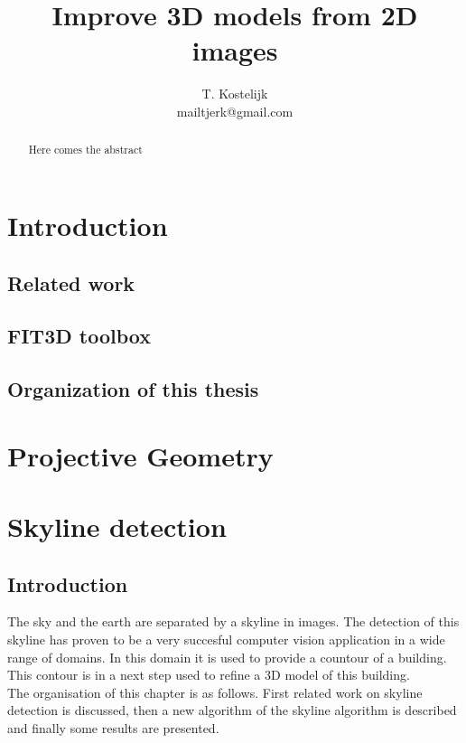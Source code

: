 \documentclass[10pt]{article}
\title{\sc Improve 3D models from 2D images}
\author{T. Kostelijk\\mailtjerk@gmail.com}
\begin{document}
\maketitle

\begin{abstract}
Here comes the abstract
\end{abstract}





\section{Introduction}
 \subsection{Related work}
 \subsection{FIT3D toolbox}
 \subsection{Organization of this thesis}

\section{Projective Geometry}

\section{Skyline detection}
 \subsection{Introduction}

The sky and the earth are separated by a skyline in images. The detection of this skyline
has proven to be a very succesful computer vision application in a wide range of
domains. In this domain it is used to provide a countour of a building. This
contour is in a next step used to refine a 3D model of this building.\\
The organisation of this chapter is as follows.  First related work on skyline
detection is discussed, then a new algorithm of the skyline algorithm is
described and finally some results are presented.\\
\end{document}
